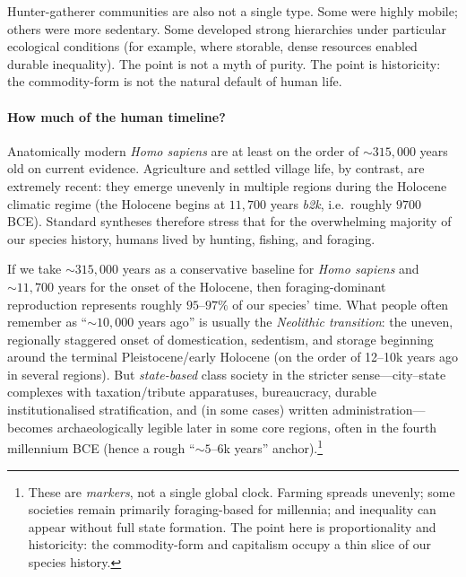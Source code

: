 Hunter-gatherer communities are also not a single type. Some were highly mobile; others were more sedentary.
Some developed strong hierarchies under particular ecological conditions (for example, where storable, dense
resources enabled durable inequality). The point is not a myth of purity. The point is historicity: the
commodity-form is not the natural default of human life.

\paragraph{How much of the human timeline?}
Anatomically modern \emph{Homo sapiens} are at least on the order of \(\sim 315{,}000\) years old on current
evidence.\cite{Hublin2017,Richter2017} Agriculture and settled village life, by contrast, are extremely recent:
they emerge unevenly in multiple regions during the Holocene climatic regime (the Holocene begins at \(11{,}700\)
years \emph{b2k}, i.e.\ roughly \(9700\) BCE).\cite{Walker2018Holocene,Zeder2011,Fuller2023}
Standard syntheses therefore stress that for the overwhelming majority of our species history, humans lived by
hunting, fishing, and foraging.\cite{LeeDaly1999}

If we take \(\sim 315{,}000\) years as a conservative baseline for \emph{Homo sapiens} and \(\sim 11{,}700\) years for the onset of the Holocene, then foraging-dominant reproduction represents roughly \(95\)–\(97\%\) of our species’ time. What people often remember as ``\(\sim 10{,}000\) years ago'' is usually the \emph{Neolithic transition}: the uneven, regionally staggered onset of domestication, sedentism, and storage beginning around the terminal Pleistocene/early Holocene (on the order of 12--10k years ago in several regions). But \emph{state-based} class society in the stricter sense---city--state complexes with taxation/tribute apparatuses, bureaucracy, durable institutionalised stratification, and (in some cases) written administration---becomes archaeologically legible later in some core regions, often in the fourth millennium BCE (hence a rough ``\(\sim 5\)–\(6\)k years'' anchor).\cite{Scott2017}\footnote{These are \emph{markers}, not a single global clock. Farming spreads unevenly; some societies remain primarily foraging-based for millennia; and inequality can appear without full state formation. The point here is proportionality and historicity: the commodity-form and capitalism occupy a thin slice of our species history.}


